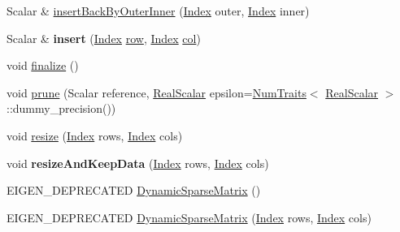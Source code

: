 \begin{DoxyCompactItemize}
\item 
Scalar \& \hyperlink{class_eigen_1_1_dynamic_sparse_matrix_ac97c2463058ae55d7f0ef21c851eb5f3}{insert\+Back\+By\+Outer\+Inner} (\hyperlink{group___core___module_a554f30542cc2316add4b1ea0a492ff02}{Index} outer, \hyperlink{group___core___module_a554f30542cc2316add4b1ea0a492ff02}{Index} inner)
\item 
\mbox{\label{class_eigen_1_1_dynamic_sparse_matrix_a4b80127847b5114a9386315f9eca74ed}} 
Scalar \& {\bfseries insert} (\hyperlink{group___core___module_a554f30542cc2316add4b1ea0a492ff02}{Index} \hyperlink{group___sparse_core___module_ac0a5563ed3f243f013fb9d2c17e230d0}{row}, \hyperlink{group___core___module_a554f30542cc2316add4b1ea0a492ff02}{Index} \hyperlink{group___sparse_core___module_a8f4eaa3c3921ef3823ffc69ebcc356af}{col})
\item 
void \hyperlink{class_eigen_1_1_dynamic_sparse_matrix_aa0abc0e4565143f103f0d7373bd4a125}{finalize} ()
\item 
void \hyperlink{class_eigen_1_1_dynamic_sparse_matrix_af3b38485a69d03e5c53d9ba57f9ce1d0}{prune} (Scalar reference, \hyperlink{group___sparse_core___module_aaec8ace6efb785c81d442931c3248d88}{Real\+Scalar} epsilon=\hyperlink{group___core___module_struct_eigen_1_1_num_traits}{Num\+Traits}$<$ \hyperlink{group___sparse_core___module_aaec8ace6efb785c81d442931c3248d88}{Real\+Scalar} $>$\+::dummy\+\_\+precision())
\item 
void \hyperlink{class_eigen_1_1_dynamic_sparse_matrix_a2d793e836fdb4bf0a85c9cf390e07861}{resize} (\hyperlink{group___core___module_a554f30542cc2316add4b1ea0a492ff02}{Index} rows, \hyperlink{group___core___module_a554f30542cc2316add4b1ea0a492ff02}{Index} cols)
\item 
\mbox{\label{class_eigen_1_1_dynamic_sparse_matrix_a6ec61a8f36ee0e3474ed33d70eb51d1b}} 
void {\bfseries resize\+And\+Keep\+Data} (\hyperlink{group___core___module_a554f30542cc2316add4b1ea0a492ff02}{Index} rows, \hyperlink{group___core___module_a554f30542cc2316add4b1ea0a492ff02}{Index} cols)
\item 
E\+I\+G\+E\+N\+\_\+\+D\+E\+P\+R\+E\+C\+A\+T\+ED \hyperlink{class_eigen_1_1_dynamic_sparse_matrix_a46a6947fcf115e6b7b731a8e01e7995d}{Dynamic\+Sparse\+Matrix} ()
\item 
E\+I\+G\+E\+N\+\_\+\+D\+E\+P\+R\+E\+C\+A\+T\+ED \hyperlink{class_eigen_1_1_dynamic_sparse_matrix_ad1c810ff3cfcc97db704d26b9d114f94}{Dynamic\+Sparse\+Matrix} (\hyperlink{group___core___module_a554f30542cc2316add4b1ea0a492ff02}{Index} rows, \hyperlink{group___core___module_a554f30542cc2316add4b1ea0a492ff02}{Index} cols)

\end{DoxyCompactItemize}
